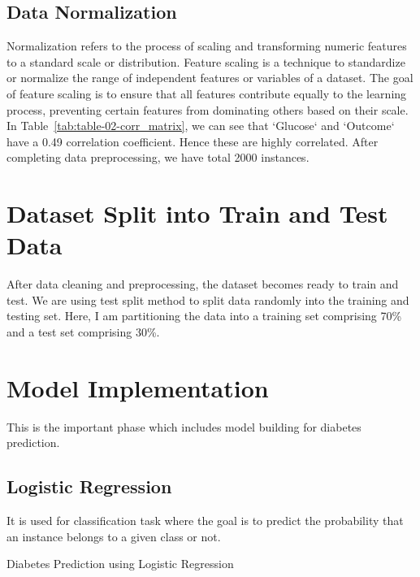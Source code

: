 \subsection{Data Normalization}
Normalization refers to the process of scaling and transforming numeric features to a standard scale or distribution. Feature scaling is a technique to standardize or normalize the range of independent features or variables of a dataset. The goal of feature scaling is to ensure that all features contribute equally to the learning process, preventing certain features from dominating others based on their scale. In Table~\ref{tab:table-02-corr_matrix}, we can see that `Glucose` and `Outcome` have a 0.49 correlation coefficient. Hence these are highly correlated. After completing data preprocessing, we have total 2000 instances.

\section{Dataset Split into Train and Test Data}
After data cleaning and preprocessing, the dataset becomes ready to train and test. We are using test split method to split data randomly into the training and testing set. Here, I am partitioning the data into a training set comprising 70\% and a test set comprising 30\%.

\section{Model Implementation}
This is the important phase which includes model building for diabetes prediction.

\subsection{Logistic Regression}
It is used for classification task where the goal is to predict the probability that an instance belongs to a given class or not.

\begin{algorithm}
    \caption{Diabetes Prediction using Logistic Regression}
    \label{algo:algo_lr}
    \begin{algorithmic}[1]
        \Statex
    \end{algorithmic}
\end{algorithm}

